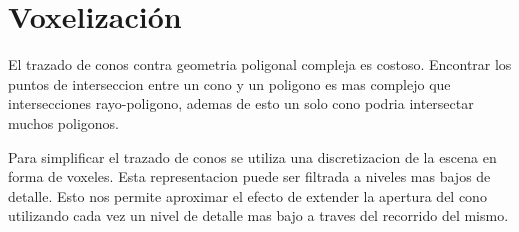 \section{Voxelización} %
\label{sec:voxelizacion}
El trazado de conos contra geometria poligonal compleja es costoso. Encontrar los puntos de interseccion entre un cono y un poligono es mas complejo que intersecciones rayo-poligono, ademas de esto un solo cono podria intersectar muchos poligonos.

Para simplificar el trazado de conos se utiliza una discretizacion de la escena en forma de voxeles. Esta representacion puede ser filtrada a niveles mas bajos de detalle. Esto nos permite aproximar el efecto de extender la apertura del cono utilizando cada vez un nivel de detalle mas bajo a traves del recorrido del mismo.

